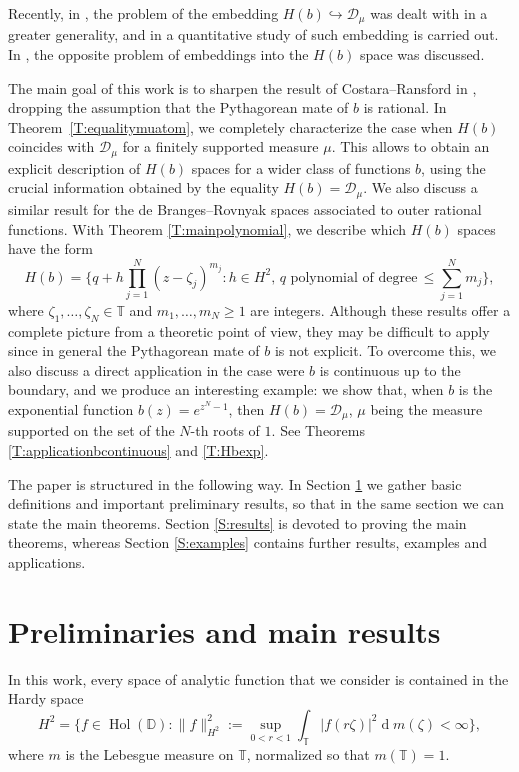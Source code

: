 \documentclass[12pt]{amsart}
\theoremstyle{definition}
\theoremstyle{remark}
\theoremstyle{remark}
\begin{document}
Recently, in \cite{bellavita2023embedding}, the problem of the embedding $H(b)\hookrightarrow\mathcal{D}_\mu$ was dealt with in a greater generality, and in \cite{differencequotientoperator} a quantitative study of such embedding is carried out. In \cite{malmanseco}, the opposite problem of embeddings into the $H(b)$ space was discussed.

The main goal of this work is to sharpen the
result of Costara--Ransford in \cite{costara2013}, dropping the assumption that the Pythagorean mate of $b$ is rational. In Theorem~\ref{T:equalitymuatom}, we completely characterize the case when
$H(b)$ coincides with $\mathcal{D}_\mu$ for a finitely supported measure $\mu$. This allows to obtain an explicit description of $H(b)$ spaces for a wider class of functions $b$, using the crucial
information obtained by the equality $H(b)=\mathcal{D}_\mu$. We
also discuss a similar result for the de
Branges--Rovnyak spaces  associated to outer rational
functions. With Theorem \ref{T:mainpolynomial}, we 
describe which $H(b)$ spaces have the form 
\[H(b)=\big\{q+h\prod_{j=1}^N(z-\zeta_j)^{m_j}\colon h\in H^2,\, q\,\,\text{polynomial of degree}\,\leq \sum_{j=1}^N m_j\big\},\]
where $\zeta_1,\ldots,\zeta_N\in\mathbb{T}$ and $m_1,\ldots,m_N\geq 1$ are integers. Although these results offer a complete picture from a theoretic point of view, they may be difficult to apply since in general the Pythagorean mate of $b$ is not explicit. To overcome this, we also discuss a direct application in the case were $b$ is continuous up to the boundary, and we produce an interesting example: we show that, when $b$ is the exponential function $b(z)=e^{z^N-1}$, then $H(b)=\mathcal{D}_\mu$, $\mu$ being the measure supported on the set of the $N$-th roots of $1$. See Theorems \ref{T:applicationbcontinuous} and \ref{T:Hbexp}.



The paper is structured in the following way. In Section \ref{S:preliminaries} we gather basic definitions and important preliminary results, so that in the same section we can state the main theorems. Section \ref{S:results} is devoted to proving the main theorems, whereas Section \ref{S:examples} contains further results, examples and applications. 

\section{Preliminaries and main results} \label{S:preliminaries}
 In this work, every space of analytic function that we consider is contained in the Hardy space
\[H^2=\big\{f\in\operatorname{Hol}(\mathbb{D})\colon \|f\|_{H^2}^2:= \sup_{0<r<1} \int_{\mathbb{T}}|f(r\zeta)|^2\operatorname{d}\!m(\zeta) <\infty\big\},\]
where $m$ is the Lebesgue measure on $\mathbb{T}$, normalized so that $m(\mathbb{T})=1$.
\end{document}
